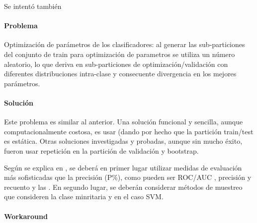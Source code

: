 \documentclass[12pt,bibliography=oldstyle,DIV=12,parskip=half-,titlepage]{scrartcl}
\begin{document}
Se intentó también 

\paragraph{Problema}
Optimización de parámetros de los clasificadores: al generar las
sub-particiones del conjunto de train para optimización de parametros
se utiliza un número aleatorio, lo que deriva en sub-particiones de
optimización/validación con diferentes distribuciones intra-clase y
consecuente divergencia en los mejores parámetros.


\paragraph{Solución}
Este problema es similar al anterior. Una solución funcional y
sencilla, aunque computacionalmente costosa, es usar
 (dando por hecho que la partición train/test es
estática. Otras soluciones investigadas y probadas, aunque sin mucho
éxito, fueron usar repetición en la partición de validación y
bootstrap.

Según se explica en \cite{weiss}, se deberá en primer lugar utilizar
medidas de evaluación más sofisticadas que la precisión (P\%), como
pueden ser ROC/AUC \cite{bradley}\cite{provost}, precisión y
recuento \cite{carvalho}\cite{japkowicz} y las 
\cite{vanrijsbergen}.  En segundo lugar, se deberán considerar métodos
de muestreo que consideren la clase minritaria
\cite{japkowicz1}\cite{weiss2} y \cite{yan} en el caso SVM.

\paragraph{Workaround}


\renewcommand{\bibfont}{\normalfont\footnotesize}
\printbibliography
\end{document}
